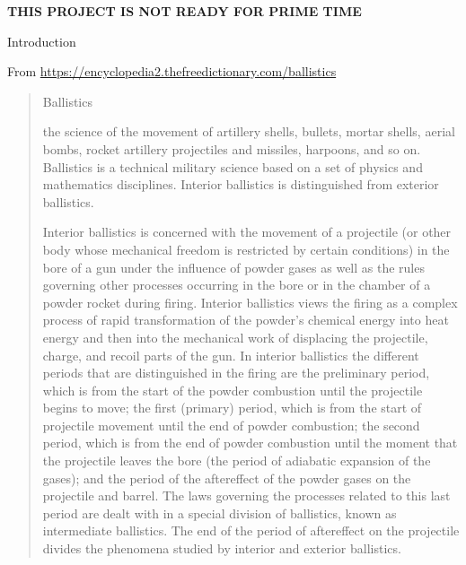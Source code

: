 
\textbf{THIS PROJECT IS NOT READY FOR PRIME TIME}

 {Introduction}

From \url{https://encyclopedia2.thefreedictionary.com/ballistics}

\begin{quotation}
Ballistics 

the science of the movement of artillery shells, bullets, mortar
shells, aerial bombs, rocket artillery projectiles and missiles,
harpoons, and so on. Ballistics is a technical military science based
on a set of physics and mathematics disciplines. Interior ballistics
is distinguished from exterior ballistics.

Interior ballistics is concerned with the movement of a projectile (or
other body whose mechanical freedom is restricted by certain
conditions) in the bore of a gun under the influence of powder gases
as well as the rules governing other processes occurring in the bore
or in the chamber of a powder rocket during firing. Interior
ballistics views the firing as a complex process of rapid
transformation of the powder’s chemical energy into heat energy and
then into the mechanical work of displacing the projectile, charge,
and recoil parts of the gun. In interior ballistics the different
periods that are distinguished in the firing are the preliminary
period, which is from the start of the powder combustion until the
projectile begins to move; the first (primary) period, which is from
the start of projectile movement until the end of powder combustion;
the second period, which is from the end of powder combustion until
the moment that the projectile leaves the bore (the period of
adiabatic expansion of the gases); and the period of the aftereffect
of the powder gases on the projectile and barrel. The laws governing
the processes related to this last period are dealt with in a special
division of ballistics, known as intermediate ballistics. The end of
the period of aftereffect on the projectile divides the phenomena
studied by interior and exterior ballistics.


\end{quotation}
